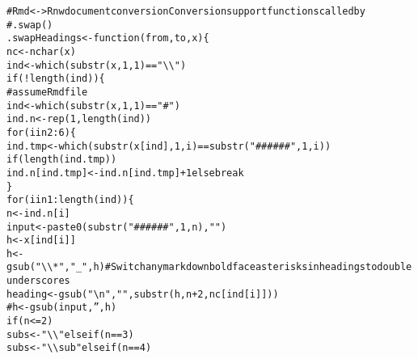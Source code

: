 \documentclass{article}\usepackage[]{graphicx}\usepackage[]{color}
\makeatletter
\newcommand{\hlnum}[1]{\textcolor[rgb]{0.863,0.196,0.184}{#1}}%
\newcommand{\hlstr}[1]{\textcolor[rgb]{0.863,0.196,0.184}{#1}}%
\newcommand{\hlcom}[1]{\textcolor[rgb]{0.345,0.431,0.459}{#1}}%
\newcommand{\hlopt}[1]{\textcolor[rgb]{0.576,0.631,0.631}{#1}}%
\newcommand{\hlstd}[1]{\textcolor[rgb]{0.514,0.58,0.588}{#1}}%
\newcommand{\hlkwa}[1]{\textcolor[rgb]{0.796,0.294,0.086}{#1}}%
\newcommand{\hlkwb}[1]{\textcolor[rgb]{0.522,0.6,0}{#1}}%
\newcommand{\hlkwc}[1]{\textcolor[rgb]{0.796,0.294,0.086}{#1}}%
\newcommand{\hlkwd}[1]{\textcolor[rgb]{0.576,0.631,0.631}{#1}}%
\newenvironment{kframe}{%
 \def\at@end@of@kframe{}%
 \ifinner\ifhmode%
  \def\at@end@of@kframe{\end{minipage}}%
  \begin{minipage}{\columnwidth}%
 \fi\fi%
 \def\FrameCommand##1{\hskip\@totalleftmargin \hskip-\fboxsep
 \colorbox{shadecolor}{##1}\hskip-\fboxsep
     \hskip-\linewidth \hskip-\@totalleftmargin \hskip\columnwidth}%
 \MakeFramed {\advance\hsize-\width
   \@totalleftmargin\z@ \linewidth\hsize
   \@setminipage}}%
 {\par\unskip\endMakeFramed%
 \at@end@of@kframe}
\newenvironment{knitrout}{}{} %
\makeatother
\begin{document}
\begin{knitrout}
\color{fgcolor}\begin{kframe}
\begin{alltt}
\hlcom{# Rmd <-> Rnw document conversion Conversion support functions called by}
\hlcom{# .swap()}
\hlstd{.swapHeadings} \hlkwb{<-} \hlkwa{function}\hlstd{(}\hlkwc{from}\hlstd{,} \hlkwc{to}\hlstd{,} \hlkwc{x}\hlstd{) \{}
    \hlstd{nc} \hlkwb{<-} \hlkwd{nchar}\hlstd{(x)}
    \hlstd{ind} \hlkwb{<-} \hlkwd{which}\hlstd{(}\hlkwd{substr}\hlstd{(x,} \hlnum{1}\hlstd{,} \hlnum{1}\hlstd{)} \hlopt{==} \hlstr{"\textbackslash{}\textbackslash{}"}\hlstd{)}
    \hlkwa{if} \hlstd{(}\hlopt{!}\hlkwd{length}\hlstd{(ind)) \{}
        \hlcom{# assume Rmd file}
        \hlstd{ind} \hlkwb{<-} \hlkwd{which}\hlstd{(}\hlkwd{substr}\hlstd{(x,} \hlnum{1}\hlstd{,} \hlnum{1}\hlstd{)} \hlopt{==} \hlstr{"#"}\hlstd{)}
        \hlstd{ind.n} \hlkwb{<-} \hlkwd{rep}\hlstd{(}\hlnum{1}\hlstd{,} \hlkwd{length}\hlstd{(ind))}
        \hlkwa{for} \hlstd{(i} \hlkwa{in} \hlnum{2}\hlopt{:}\hlnum{6}\hlstd{) \{}
            \hlstd{ind.tmp} \hlkwb{<-} \hlkwd{which}\hlstd{(}\hlkwd{substr}\hlstd{(x[ind],} \hlnum{1}\hlstd{, i)} \hlopt{==} \hlkwd{substr}\hlstd{(}\hlstr{"######"}\hlstd{,} \hlnum{1}\hlstd{, i))}
            \hlkwa{if} \hlstd{(}\hlkwd{length}\hlstd{(ind.tmp))}
                \hlstd{ind.n[ind.tmp]} \hlkwb{<-} \hlstd{ind.n[ind.tmp]} \hlopt{+} \hlnum{1} \hlkwa{else break}
        \hlstd{\}}
        \hlkwa{for} \hlstd{(i} \hlkwa{in} \hlnum{1}\hlopt{:}\hlkwd{length}\hlstd{(ind)) \{}
            \hlstd{n} \hlkwb{<-} \hlstd{ind.n[i]}
            \hlstd{input} \hlkwb{<-} \hlkwd{paste0}\hlstd{(}\hlkwd{substr}\hlstd{(}\hlstr{"######"}\hlstd{,} \hlnum{1}\hlstd{, n),} \hlstr{" "}\hlstd{)}
            \hlstd{h} \hlkwb{<-} \hlstd{x[ind[i]]}
            \hlstd{h} \hlkwb{<-} \hlkwd{gsub}\hlstd{(}\hlstr{"\textbackslash{}\textbackslash{}*"}\hlstd{,} \hlstr{"_"}\hlstd{, h)}  \hlcom{# Switch any markdown boldface asterisks in headings to double underscores}
            \hlstd{heading} \hlkwb{<-} \hlkwd{gsub}\hlstd{(}\hlstr{"\textbackslash{}n"}\hlstd{,} \hlstr{""}\hlstd{,} \hlkwd{substr}\hlstd{(h, n} \hlopt{+} \hlnum{2}\hlstd{, nc[ind[i]]))}
            \hlcom{# h <- gsub(input, '', h)}
            \hlkwa{if} \hlstd{(n} \hlopt{<=} \hlnum{2}\hlstd{)}
                \hlstd{subs} \hlkwb{<-} \hlstr{"\textbackslash{}\textbackslash{}"} \hlkwa{else if} \hlstd{(n} \hlopt{==} \hlnum{3}\hlstd{)}
                \hlstd{subs} \hlkwb{<-} \hlstr{"\textbackslash{}\textbackslash{}sub"} \hlkwa{else if} \hlstd{(n} \hlopt{==} \hlnum{4}\hlstd{)}

\end{alltt}
\end{kframe}
\end{knitrout}
\end{document}
